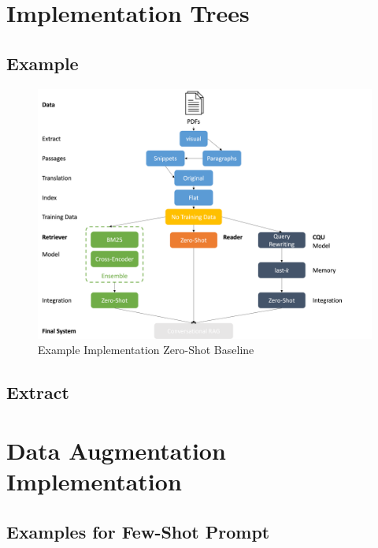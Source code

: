 \section{Implementation Trees}
\label{ref:appendixA-implementation}

\subsection{Example}

\begin{figure}[H]
    \centering
    \includegraphics[width=\textwidth]{Grafiken/example_decission_tree.png}
    \caption{Example Implementation Zero-Shot Baseline}
    \label{fig:example-implementation-tree}
\end{figure}

\subsection{Extract}

\section{Data Augmentation Implementation}
\label{ref:appendixA-data-augmentation}

\subsection{Examples for Few-Shot Prompt}
\label{ref:appendixA-data-augmentation-few-shot-prompt}

